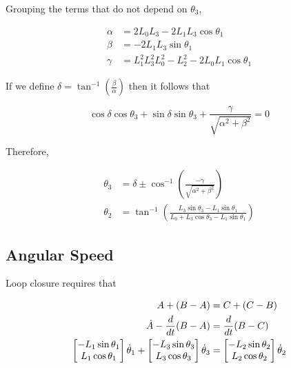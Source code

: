 \documentclass[letterpaper]{article}
\begin{document}
\noindent Grouping the terms that do not depend on $\theta_3$,

\begin{align}
	\alpha &= 2 L_0 L_3 - 2 L_1 L_3 \cos \theta_1 \\
	\beta &= -2 L_1 L_3 \sin \theta_1 \\
	\gamma &= L_1^2 L_3^2 L_0^2 - L_2^2 - 2 L_0 L_1 \cos \theta_1 
\end{align}

\noindent If we define $\delta = \tan^{-1} \left( \frac{\beta}{\alpha} \right)$ then it follows that

\begin{equation}
	\cos \delta \cos \theta_3 + \sin \delta \sin \theta_3 + \frac{\gamma}{\sqrt{\alpha^2 + \beta^2}} = 0
\end{equation}

\noindent Therefore, 

\begin{align}
	\theta_3 &= \delta \pm \cos^{-1} \left( \frac{- \gamma}{\sqrt{\alpha^2 + \beta^2}} \right) \\
	\theta_2 &= \tan^{-1} \left( \frac{ L_3 \sin \theta_3 - L_1 \sin \theta_1}{L_0 + L_3 \cos \theta_3 - L_1 \sin \theta_1} \right)
\end{align}

\subsection{Angular Speed}

Loop closure requires that

\begin{align}
	A + (B - A) &= C + (C - B) \notag \\
	\dot{A} - \frac{d}{dt} (B - A) &= \frac{d}{dt} ( B - C) \label{eq:dloop}\\
	\begin{bmatrix} -L_1 \sin \theta_1 \\ L_1 \cos \theta_1 \end{bmatrix} \dot{\theta}_1 + \begin{bmatrix} -L_3 \sin \theta_3 \\ L_3 \cos \theta_3 \end{bmatrix} \dot{\theta}_3 &= \begin{bmatrix} -L_2 \sin \theta_2 \\ L_2 \cos \theta_2 \end{bmatrix} \dot{\theta}_2
	\end{align}
\end{document}
